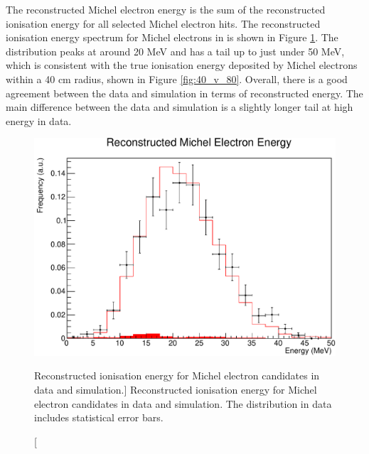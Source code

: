 The reconstructed Michel electron energy is the sum of the reconstructed
ionisation energy for all selected Michel electron hits. The reconstructed
ionisation energy spectrum for Michel electrons in \protodune{} is shown in
Figure \ref{fig:michel_ion_reco}. The distribution peaks at around 20 MeV and
has a tail up to just under 50 MeV, which is consistent with the true
ionisation energy deposited by Michel electrons within a 40 cm radius, shown
in Figure \ref{fig:40_v_80}. Overall, there is a good agreement between the data
and simulation in terms of reconstructed energy. The main difference between the
data and simulation is a slightly longer tail at high energy in data.
\begin{figure}
	\centering
	\includegraphics[width=\textwidth]{figures/michel_ion_reco.pdf}
	\caption
	[Reconstructed ionisation energy for Michel electron candidates in
	\protodune{} data and simulation.]
	{ Reconstructed ionisation energy for Michel electron candidates in
	\protodune{} data and simulation. The distribution in data includes
	statistical error bars. }
	\label{fig:michel_ion_reco}
\end{figure}

